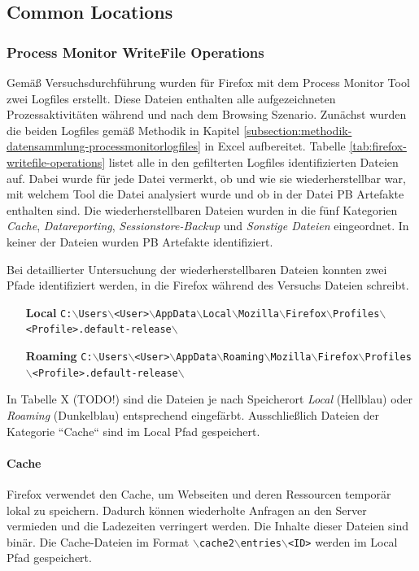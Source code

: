 \begin{appendices}
\subsection{Common Locations}
\label{subsection:appendix-firefox-common-locations}
\subsubsection*{Process Monitor WriteFile Operations}
\label{subsubsection:appendix-firefox-common-locations-writefile-operations}
Gemäß Versuchsdurchführung wurden für Firefox mit dem Process Monitor Tool zwei Logfiles erstellt. Diese Dateien enthalten alle aufgezeichneten Prozessaktivitäten während und nach dem Browsing Szenario.
Zunächst wurden die beiden Logfiles gemäß Methodik in Kapitel \ref{subsection:methodik-datensammlung-processmonitorlogfiles} in Excel aufbereitet. Tabelle \ref{tab:firefox-writefile-operations} listet alle in den gefilterten Logfiles identifizierten Dateien auf. Dabei wurde für jede Datei vermerkt, ob und wie sie wiederherstellbar war, mit welchem Tool die Datei analysiert wurde und ob in der Datei PB Artefakte enthalten sind. Die wiederherstellbaren Dateien wurden in die fünf Kategorien \textit{Cache}, \textit{Datareporting}, \textit{Sessionstore-Backup} und \textit{Sonstige Dateien} eingeordnet. In keiner der Dateien wurden PB Artefakte identifiziert.

Bei detaillierter Untersuchung der wiederherstellbaren Dateien konnten zwei Pfade identifiziert werden, in die Firefox während des Versuchs Dateien schreibt. 
\begin{itemize}
\item[\textbf{Local}] \texttt{C:$\backslash$Users$\backslash$<User>$\backslash$AppData$\backslash$Local$\backslash$Mozilla$\backslash$Firefox$\backslash$Profiles$\backslash$<Profile>.default-release$\backslash$}
\item[\textbf{Roaming}] \texttt{C:$\backslash$Users$\backslash$<User>$\backslash$AppData$\backslash$Roaming$\backslash$Mozilla$\backslash$Firefox$\backslash$Profiles$\backslash$<Profile>.default-release$\backslash$}
\end{itemize}
In Tabelle X (TODO!) sind die Dateien je nach Speicherort \textit{Local} (Hellblau) oder \textit{Roaming} (Dunkelblau) entsprechend eingefärbt. Ausschließlich Dateien der Kategorie ``Cache`` sind im Local Pfad gespeichert.

\paragraph*{Cache}
Firefox verwendet den Cache, um Webseiten und deren Ressourcen temporär lokal zu speichern. Dadurch können wiederholte Anfragen an den Server vermieden und die Ladezeiten verringert werden. Die Inhalte dieser Dateien sind binär.
Die Cache-Dateien im Format \texttt{$\backslash$cache2$\backslash$entries$\backslash$<ID>} werden im Local Pfad gespeichert.


\end{appendices}
